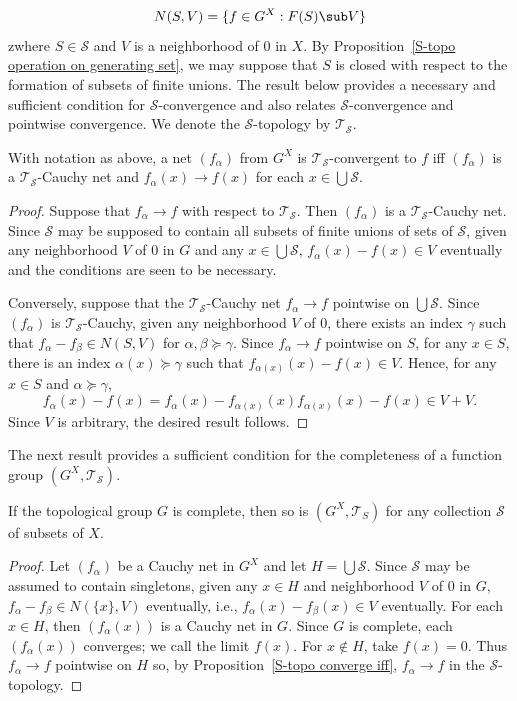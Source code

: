 \[N(S,V)=\{f\in G^X:F(S)\sub V\}\]
zwhere $S\in\mathcal{S}$ and $V$ is a neighborhood of $0$ in $X$. By Proposition~\ref{S-topo operation on generating set}, we may suppose that $S$ is closed with respect to the formation of subsets of finite unions. The result below provides a necessary and sufficient condition for $\mathcal{S}$-convergence and also relates $\mathcal{S}$-convergence and pointwise convergence. We denote the $\mathcal{S}$-topology by $\mathcal{T}_{\mathcal{S}}$.
\begin{proposition}\label{S-topo converge iff}
With notation as above, a net $(f_\alpha)$ from $G^X$ is $\mathcal{T}_{\mathcal{S}}$-convergent to $f$ iff $(f_\alpha)$ is a $\mathcal{T}_{\mathcal{S}}$-Cauchy net and $f_\alpha(x)\to f(x)$ for each $x\in\bigcup\mathcal{S}$.
\end{proposition}
\begin{proof}
Suppose that $f_\alpha\to f$ with respect to $\mathcal{T}_{\mathcal{S}}$. Then $(f_\alpha)$ is a $\mathcal{T}_{\mathcal{S}}$-Cauchy net. Since $\mathcal{S}$ may be supposed to contain all subsets of finite unions of sets of $\mathcal{S}$, given any neighborhood $V$ of $0$ in $G$ and any $x\in\bigcup\mathcal{S}$, $f_\alpha(x)-f(x)\in V$ eventually and the conditions are seen to be necessary.\par
Conversely, suppose that the $\mathcal{T}_{\mathcal{S}}$-Cauchy net $f_\alpha\to f$ pointwise on $\bigcup\mathcal{S}$. Since $(f_\alpha)$ is $\mathcal{T}_{\mathcal{S}}$-Cauchy, given any neighborhood $V$ of $0$, there exists an index $\gamma$ such that $f_\alpha-f_\beta\in N(S,V)$ for $\alpha,\beta\succeq\gamma$. Since $f_\alpha\to f$ pointwise on $S$, for any $x\in S$, there is an index $\alpha(x)\succeq\gamma$ such that $f_{\alpha(x)}(x)-f(x)\in V$. Hence, for any $x\in S$ and $\alpha\succeq\gamma$,
\[f_\alpha(x)-f(x)=f_\alpha(x)-f_{\alpha(x)}(x)f_{\alpha(x)}(x)-f(x)\in V+V.\]
Since $V$ is arbitrary, the desired result follows.
\end{proof}
The next result provides a sufficient condition for the completeness of a function group $(G^X,\mathcal{T}_{\mathcal{S}})$.
\begin{proposition}\label{S-topo complete if group is}
If the topological group $G$ is complete, then so is $(G^X,\mathcal{T}_S)$ for any collection $\mathcal{S}$ of subsets of $X$.
\end{proposition}
\begin{proof}
Let $(f_\alpha)$ be a Cauchy net in $G^X$ and let $H=\bigcup\mathcal{S}$. Since $\mathcal{S}$ may be assumed to contain singletons, given any $x\in H$ and neighborhood $V$ of $0$ in $G$, $f_\alpha-f_\beta\in N(\{x\},V)$ eventually, i.e., $f_\alpha(x)-f_\beta(x)\in V$ eventually. For each $x\in H$, then $(f_\alpha(x))$ is a Cauchy net in $G$. Since $G$ is complete, each $(f_\alpha(x))$ converges; we call the limit $f(x)$. For $x\notin H$, take $f(x)=0$. Thus $f_\alpha\to f$ pointwise on $H$ so, by Proposition~\ref{S-topo converge iff}, $f_\alpha\to f$ in the $\mathcal{S}$-topology.
\end{proof}
